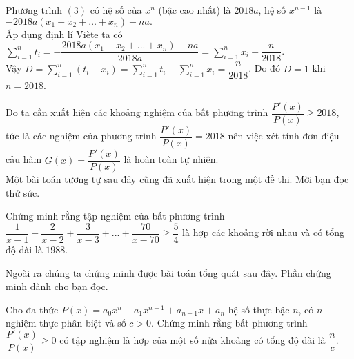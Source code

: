 \begin{bt}
{		Phương trình $(3)$ có hệ số của $x^n$ (bậc cao nhất) là $2018a$, hệ số $x^{n-1}$ là\\ $-2018 a\left(x_1+x_2+\ldots+x_n\right)-na.$\\
		Áp dụng định lí Viète ta có
		$\displaystyle\sum\limits_{i=1}^n{t_i}=-\dfrac{2018a(x_1+x_2+...+x_n)-na}{2018a}=\displaystyle\sum\limits_{i=1}^n{x_i}+\dfrac{n}{2018}$.\\
		Vậy $D=\displaystyle\sum\limits_{i=1}^n{\left(t_i-x_i\right)=\displaystyle\sum\limits_{i=1}^n{t_i}-\displaystyle\sum\limits_{i=1}^n{x_i}=\dfrac{n}{2018}}$. Do đó $D=1$ khi $n=2018$.
		\begin{nx}
			Do ta cần xuất hiện các khoảng nghiệm của bất phương trình $\dfrac{P'(x)}{P(x)}\ge 2018$, tức là các nghiệm của phương trình $\dfrac{P'(x)}{P(x)}=2018$ nên việc xét tính đơn điệu cảu hàm $G(x)=\dfrac{P'(x)}{P(x)}$ là hoàn toàn tự nhiên.\\
			Một bài toán tương tự sau đây cũng đã xuất hiện trong một đề thi. Mời bạn đọc thử sức.	
		\end{nx}
	}
\end{bt}

\begin{bt}%
	Chứng minh rằng tập nghiệm của bất phương trình $\dfrac{1}{x-1}+\dfrac{2}{x-2}+\dfrac{3}{x-3}+...+\dfrac{70}{x-70}\ge \dfrac{5}{4}$ là hợp các khoảng rời nhau và có tổng độ dài là $1988$.
\end{bt}
Ngoài ra chúng ta chứng minh được bài toán tổng quát sau đây. Phần chứng minh dành cho bạn đọc.
\begin{bt}%
	Cho đa thức $P(x)=a_0x^n+a_1x^{n-1}+a_{n-1}x+a_n$ hệ số thực bậc $n$, có $n$ nghiệm thực phân biệt và số $c>0$. Chứng minh rằng bất phương trình $\dfrac{P'(x)}{P(x)}\ge 0$ có tập nghiệm là hợp của một số nửa khoảng có tổng độ dài là $\dfrac{n}{c}$.
\end{bt}

